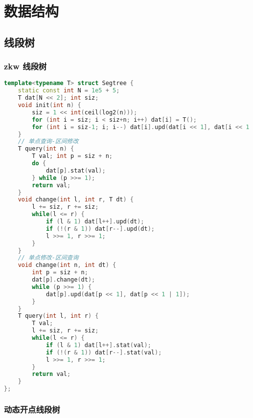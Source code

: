 

\section{数据结构}

\subsection{线段树}


\subsubsection{zkw 线段树}

\begin{lstlisting}[language=C++]
template<typename T> struct Segtree {
    static const int N = 1e5 + 5;
    T dat[N << 2]; int siz;
    void init(int n) {
        siz = 1 << int(ceil(log2(n)));
        for (int i = siz; i < siz+n; i++) dat[i] = T();
        for (int i = siz-1; i; i--) dat[i].upd(dat[i << 1], dat[i << 1 | 1]);
    }
    // 单点查询-区间修改
    T query(int n) {
        T val; int p = siz + n;
        do {
            dat[p].stat(val);
        } while (p >>= 1);
        return val;
    }
    void change(int l, int r, T dt) {
        l += siz, r += siz;
        while(l <= r) {
            if (l & 1) dat[l++].upd(dt);
            if (!(r & 1)) dat[r--].upd(dt);
            l >>= 1, r >>= 1;
        }
    }
    // 单点修改-区间查询
    void change(int n, int dt) {
        int p = siz + n;
        dat[p].change(dt);
        while (p >>= 1) {
            dat[p].upd(dat[p << 1], dat[p << 1 | 1]);
        }
    }
    T query(int l, int r) {
        T val;
        l += siz, r += siz;
        while(l <= r) {
            if (l & 1) dat[l++].stat(val);
            if (!(r & 1)) dat[r--].stat(val);
            l >>= 1, r >>= 1;
        }
        return val;
    }
};
\end{lstlisting}

\subsubsection{动态开点线段树}

